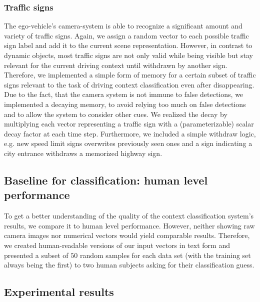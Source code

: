 \subsubsection{Traffic signs} 
The ego-vehicle's camera-system \cite{Aeberhard2015} is able to recognize a significant amount and variety of traffic signs. 
Again, we assign a random vector to each possible traffic sign label and add it to the current scene representation. 
However, in contrast to dynamic objects, most traffic signs are not only valid while being visible but stay relevant for the current driving context until withdrawn by another sign. 
Therefore, we implemented a simple form of memory for a certain subset of traffic signs relevant to the task of driving context classification even after disappearing. %
Due to the fact, that the camera system is not immune to false detections, we implemented a decaying memory, to avoid relying too much on false detections and to allow the system to consider other cues. 
We realized the decay by multiplying each vector representing a traffic sign with a (parameterizable) scalar decay factor  at each time step. 
Furthermore, we included a simple withdraw logic, e.g. new speed limit signs overwrites previously seen ones and a sign indicating a city entrance withdraws a memorized highway sign.\\
\subsection{Baseline for classification: human level performance}
To get a better understanding of the quality of the context classification system's results, we compare it to human level performance.
However, neither showing raw camera images nor numerical vectors would yield comparable results.
Therefore, we created human-readable versions of our input vectors in text form and presented a subset of $50$ random samples for each data set (with the training set always being the first) to two human subjects asking for their classification guess.
\subsection{Experimental results}
